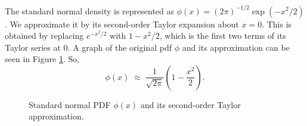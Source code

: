 \documentclass[11pt]{article}
\begin{document}
The standard normal density is represented as $\phi(x) = (2\pi)^{-1/2}\exp(-x^2/2)$. We approximate it by its second-order Taylor expansion about $x=0$. This is obtained by replacing $e^{-x^2/2}$ with $1 - x^2/2$, which is the first two terms of its Taylor series at $0$. A graph of the original pdf $\phi$ and its approximation can be seen in Figure \ref{fig:phi_approx}. So,
\begin{equation}\label{eq:phi_approx}
    \phi(x) \;\approx\; \frac{1}{\sqrt{2\pi}}\!\left(1 - \frac{x^2}{2}\right).
\end{equation}


\begin{figure}[ht]
\centering
{}
\caption{Standard normal PDF $\phi(x)$ and its second-order Taylor approximation.}
\label{fig:phi_approx}
\end{figure}
\end{document}
